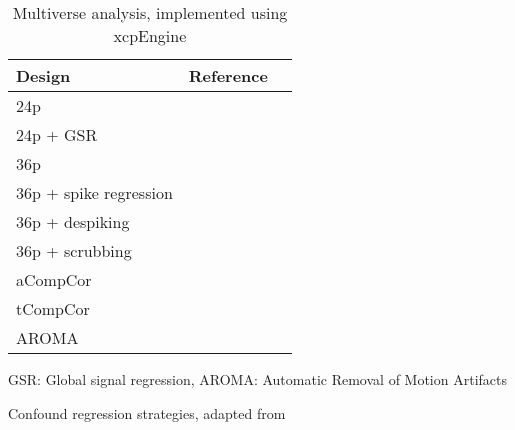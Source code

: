 \begin{table}[bt]
\begin{threeparttable}
\begin{subtable}[t]{.425\textwidth}
            \begin{tabularx}{\textwidth}{l l l}
                \toprule
                \textbf{Design}        & \textbf{Reference}                 \\
                \midrule
                24p                    & \cite{friston1996movement}         \\
                24p + GSR              & \cite{macey2004method}             \\
                36p              & \cite{satterthwaite2013improved}   \\
                36p + spike regression & \cite{cox1996afni}                 \\
                36p + despiking        & \cite{satterthwaite2013improved}   \\
                36p + scrubbing  & \cite{power2014methods}            \\
                aCompCor               & \cite{muschelli2014reduction}      \\
                tCompCor               & \cite{behzadi2007component}        \\
                AROMA                  & \cite{pruim2015ica}                \\
                \bottomrule
            \end{tabularx}
            \begin{tablenotes}
                \item GSR: Global signal regression, AROMA: Automatic Removal of Motion Artifacts
            \end{tablenotes}
            \caption{Confound regression strategies, adapted from \citep{Ciric2017-cl}}
        \end{subtable}
        \makeatletter\def\TPT@hsize{}\makeatletter
    \end{threeparttable}
    \caption{Multiverse analysis, implemented using xcpEngine \citep{ciric2018mitigating}}
    \label{tab:multiverse}
\end{table}